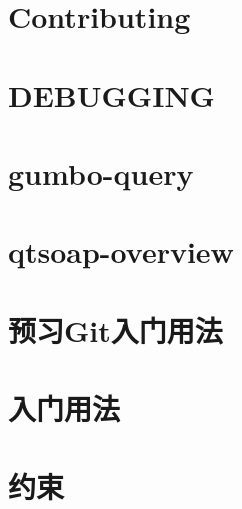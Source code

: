 \documentclass[twoside]{book}
\newcommand{\+}{\discretionary{\mbox{\scriptsize$\hookleftarrow$}}{}{}}
\begin{document}
\chapter{Contributing}
\label{md__r_1__develop_a0-develop__lib_q_qt_src_network_gumbo_parser__c_o_n_t_r_i_b_u_t_i_n_g}

\chapter{D\+E\+B\+U\+G\+G\+I\+NG}
\label{md__r_1__develop_a0-develop__lib_q_qt_src_network_gumbo_parser__d_e_b_u_g_g_i_n_g}

\chapter{gumbo-\/query}
\label{md__r_1__develop_a0-develop__lib_q_qt_src_network_gumbo_query__r_e_a_d_m_e}

\chapter{qtsoap-\/overview}
\label{qtsoap-overview}

\chapter{预习\+Git入门用法}
\label{md__r_1__develop_a0-develop__lib_q_qt_usage-git}

\chapter{入门用法}
\label{md__r_1__develop_a0-develop__lib_q_qt_usage}

\chapter{约束}
\label{md__r_1__develop_a0-develop__lib_q_qt_wiki_an-example}

\end{document}
